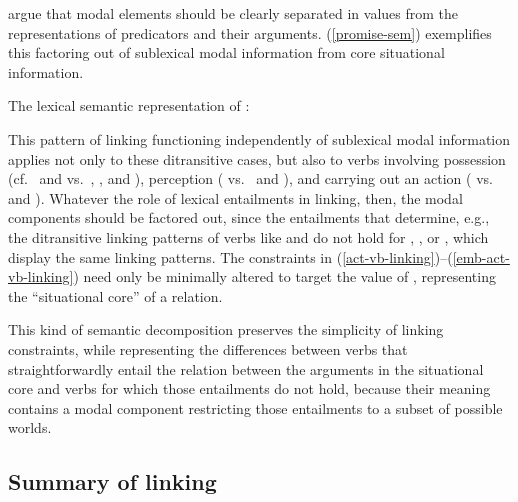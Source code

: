 \documentclass[output=paper
 	        ,biblatex
                ,babelshorthands
                ,newtxmath
                ,draftmode
                ,colorlinks, citecolor=brown
]{langscibook}
\begin{document}
\citeauthor{KoenigandDavis2001} argue that modal elements should be clearly separated in \content
values from the representations of predicators and their arguments.  (\ref{promise-sem}) exemplifies
this factoring out of sublexical modal information from core situational information. 
\begin{exe}
\ex\label{promise-sem} The lexical semantic representation of  
\citep[101]{KoenigandDavis2001}:\\
\end{exe}
This pattern of linking functioning independently of sublexical modal information applies not only to these ditransitive cases, but also to verbs involving possession (cf.\  and  vs.\ , , and ), perception ( vs.\  and ), and carrying out an action ( vs.\  and ).  Whatever the role of lexical entailments in linking, then, the modal components should be factored out, since the entailments that determine, e.g., the ditransitive linking patterns of verbs like  and  do not hold for , , or , which display the same linking patterns. The constraints in (\ref{act-vb-linking})--(\ref{emb-act-vb-linking}) need only be minimally altered to target the value of , representing the ``situational core'' of a relation.

 
This kind of semantic decomposition preserves the simplicity of linking constraints, while representing the differences between verbs that straightforwardly entail the relation between the arguments in the situational core and verbs for which those entailments do not hold, because their meaning contains a modal component restricting those entailments to a subset of possible worlds.

\subsection{Summary of linking}
\end{document}
